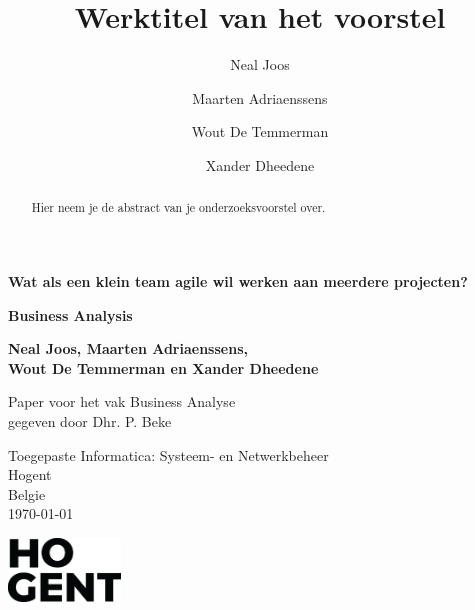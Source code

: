 \documentclass{hogent-article}
\title{Werktitel van het voorstel}
\author{Neal Joos}
\author{Maarten Adriaenssens}
\author{Wout De Temmerman}
\author{Xander Dheedene}
\begin{document}
\begin{titlepage}
  \begin{center}
      \vspace*{1cm}

      {\huge \color{hogent-blue} \textbf{Wat als een klein team agile wil werken aan meerdere projecten?}}

      \vspace{0.5cm}
      \textbf{Business Analysis}
      
      \vspace{1.5cm}

      \textbf{
        Neal Joos, Maarten Adriaenssens, \\
        Wout De Temmerman en Xander Dheedene
      }

      \vfill
      
      Paper voor het vak Business Analyse\\
      gegeven door Dhr. P. Beke
      
      


      \vspace{0.8cm}
      Toegepaste Informatica: Systeem- en Netwerkbeheer\\
      Hogent\\
      Belgie\\
      \today\\

      \vspace{5mm}

      \begin{center}
        \includegraphics[width=3cm,right]{./img/HOGENT_Logo_Pos_rgb.png}
      \end{center}

  \end{center}
\end{titlepage}

\begin{abstract}
  Hier neem je de abstract van je onderzoeksvoorstel over.
\end{abstract}

\tableofcontents

\bigskip

%
%
%
\end{document}
